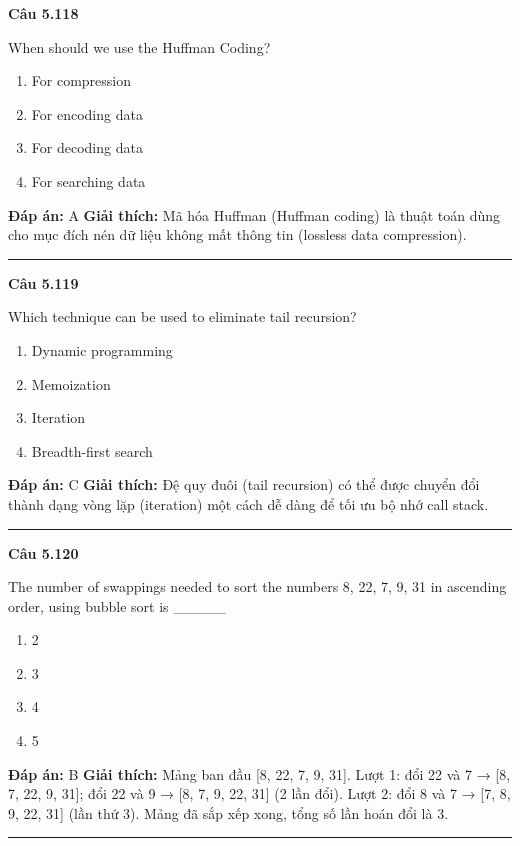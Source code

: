 \documentclass[11pt,a4paper]{article}
\newenvironment{question}[1]{%
  \par\vspace{1em}\noindent\textbf{\large Câu #1}\par\vspace{0.4em}
}{%
  \par\vspace{1em}\hrule\vspace{0.6em}
}
\newenvironment{choices}{%
  \begin{enumerate}[label=\textbf{\Alph*.},leftmargin=2.2em,itemsep=2pt,topsep=3pt]
}{%
  \end{enumerate}
}
\newcommand{\choice}{\item}
\begin{document}
\begin{question}{5.118}
When should we use the Huffman Coding?
\begin{choices}
\choice For compression
\choice For encoding data
\choice For decoding data
\choice For searching data
\end{choices}
\textbf{Đáp án:} A
\textbf{Giải thích:} Mã hóa Huffman (Huffman coding) là thuật toán dùng cho mục đích nén dữ liệu không mất thông tin (lossless data compression).
\end{question}

\begin{question}{5.119}
Which technique can be used to eliminate tail recursion?
\begin{choices}
\choice Dynamic programming
\choice Memoization
\choice Iteration
\choice Breadth-first search
\end{choices}
\textbf{Đáp án:} C
\textbf{Giải thích:} Đệ quy đuôi (tail recursion) có thể được chuyển đổi thành dạng vòng lặp (iteration) một cách dễ dàng để tối ưu bộ nhớ call stack.
\end{question}

\begin{question}{5.120}
The number of swappings needed to sort the numbers 8, 22, 7, 9, 31 in ascending order, using bubble sort is _____
\begin{choices}
\choice 2
\choice 3
\choice 4
\choice 5
\end{choices}
\textbf{Đáp án:} B
\textbf{Giải thích:} Mảng ban đầu [8, 22, 7, 9, 31]. Lượt 1: đổi 22 và 7 → [8, 7, 22, 9, 31]; đổi 22 và 9 → [8, 7, 9, 22, 31] (2 lần đổi). Lượt 2: đổi 8 và 7 → [7, 8, 9, 22, 31] (lần thứ 3). Mảng đã sắp xếp xong, tổng số lần hoán đổi là 3.
\end{question}
\end{document}
